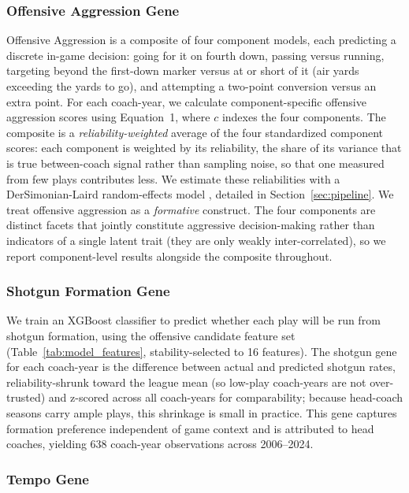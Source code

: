 \documentclass[USenglish]{article}
\theoremstyle{dgthm}
\theoremstyle{dgdef}
\begin{document}
\subsubsection{Offensive Aggression Gene}

Offensive Aggression is a composite of four component models, each predicting a discrete in-game decision: going for it on fourth down, passing versus running, targeting beyond the first-down marker versus at or short of it (air yards exceeding the yards to go), and attempting a two-point conversion versus an extra point. For each coach-year, we calculate component-specific offensive aggression scores using Equation~1, where $c$ indexes the four components. The composite is a \emph{reliability-weighted} average of the four standardized component scores: each component is weighted by its reliability, the share of its variance that is true between-coach signal rather than sampling noise, so that one measured from few plays contributes less. We estimate these reliabilities with a DerSimonian-Laird random-effects model \citep{dersimonian1986}, detailed in Section~\ref{sec:pipeline}. We treat offensive aggression as a \emph{formative} construct. The four components are distinct facets that jointly constitute aggressive decision-making rather than indicators of a single latent trait (they are only weakly inter-correlated), so we report component-level results alongside the composite throughout.

\subsubsection{Shotgun Formation Gene}

We train an XGBoost classifier to predict whether each play will be run from shotgun formation, using the offensive candidate feature set (Table~\ref{tab:model_features}, stability-selected to 16 features). The shotgun gene for each coach-year is the difference between actual and predicted shotgun rates, reliability-shrunk toward the league mean (so low-play coach-years are not over-trusted) and z-scored across all coach-years for comparability; because head-coach seasons carry ample plays, this shrinkage is small in practice. This gene captures formation preference independent of game context and is attributed to head coaches, yielding 638 coach-year observations across 2006--2024.

\subsubsection{Tempo Gene}
\end{document}

